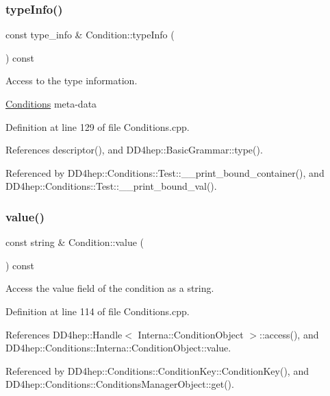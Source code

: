\subsubsection{\texorpdfstring{type\+Info()}{typeInfo()}}
{\footnotesize\ttfamily const type\+\_\+info \& Condition\+::type\+Info (\begin{DoxyParamCaption}{ }\end{DoxyParamCaption}) const}



Access to the type information. 

\hyperlink{namespace_d_d4hep_1_1_conditions}{Conditions} meta-\/data 

Definition at line 129 of file Conditions.\+cpp.



References descriptor(), and D\+D4hep\+::\+Basic\+Grammar\+::type().



Referenced by D\+D4hep\+::\+Conditions\+::\+Test\+::\+\_\+\+\_\+print\+\_\+bound\+\_\+container(), and D\+D4hep\+::\+Conditions\+::\+Test\+::\+\_\+\+\_\+print\+\_\+bound\+\_\+val().

\hypertarget{class_d_d4hep_1_1_conditions_1_1_condition_a7f9601669ce1343a47389c077cc21726}{}\label{class_d_d4hep_1_1_conditions_1_1_condition_a7f9601669ce1343a47389c077cc21726} 
\subsubsection{\texorpdfstring{value()}{value()}}
{\footnotesize\ttfamily const string \& Condition\+::value (\begin{DoxyParamCaption}{ }\end{DoxyParamCaption}) const}



Access the value field of the condition as a string. 



Definition at line 114 of file Conditions.\+cpp.



References D\+D4hep\+::\+Handle$<$ Interna\+::\+Condition\+Object $>$\+::access(), and D\+D4hep\+::\+Conditions\+::\+Interna\+::\+Condition\+Object\+::value.



Referenced by D\+D4hep\+::\+Conditions\+::\+Condition\+Key\+::\+Condition\+Key(), and D\+D4hep\+::\+Conditions\+::\+Conditions\+Manager\+Object\+::get().



